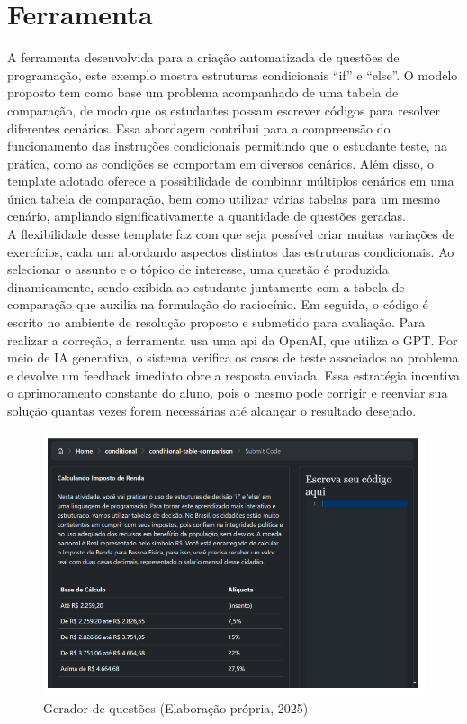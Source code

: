 \section{Ferramenta}

A ferramenta desenvolvida para a criação automatizada de questões de programação, este exemplo mostra estruturas condicionais “if” e “else”. O modelo proposto  tem como base um problema acompanhado de uma tabela de comparação, de modo que os estudantes possam escrever códigos para resolver diferentes cenários. Essa abordagem contribui para a compreensão do funcionamento das instruções condicionais permitindo que o estudante teste, na prática, como as condições se comportam em diversos cenários. Além disso, o template adotado oferece a possibilidade de combinar múltiplos cenários em uma única tabela de comparação, bem como utilizar várias tabelas para um mesmo cenário, ampliando significativamente a quantidade de questões geradas. 
\\
A flexibilidade desse template faz com que seja possível criar muitas variações de exercícios, cada um abordando aspectos distintos das estruturas condicionais. Ao selecionar o assunto e o tópico de interesse, uma questão é produzida dinamicamente, sendo exibida ao estudante juntamente com a tabela de comparação que auxilia na formulação do raciocínio. Em seguida, o código é escrito no ambiente de resolução proposto e submetido para avaliação. Para realizar a correção, a ferramenta usa uma \gls{api} da OpenAI, que utiliza o GPT. Por meio de IA generativa, o sistema verifica os casos de teste associados ao problema e devolve um feedback imediato obre a resposta enviada. Essa estratégia incentiva o aprimoramento constante do aluno, pois o mesmo pode corrigir e reenviar sua solução quantas vezes forem necessárias até alcançar o resultado desejado. 

\begin{figure}[ht]
	\centering
	\includegraphics[width=17cm]{./imagens/capitulo7/ferramenta}
	\caption{Gerador de questões (Elaboração própria, 2025) }
	\label{fig:ferramenta}
\end{figure}

